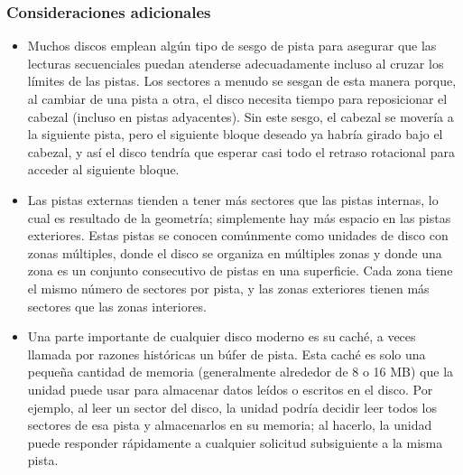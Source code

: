 \documentclass[openany]{book}
\begin{document}
\subsubsection{Consideraciones adicionales}
\begin{itemize}
    \item Muchos discos emplean algún tipo de sesgo de pista para asegurar que las lecturas secuenciales puedan atenderse adecuadamente incluso al cruzar los límites de las pistas. Los sectores a menudo se sesgan de esta manera porque, al cambiar de una pista a otra, el disco necesita tiempo para reposicionar el cabezal (incluso en pistas adyacentes). Sin este sesgo, el cabezal se movería a la siguiente pista, pero el siguiente bloque deseado ya habría girado bajo el cabezal, y así el disco tendría que esperar casi todo el retraso rotacional para acceder al siguiente bloque.
    \item Las pistas externas tienden a tener más sectores que las pistas internas, lo cual es resultado de la geometría; simplemente hay más espacio en las pistas exteriores. Estas pistas se conocen comúnmente como unidades de disco con zonas múltiples, donde el disco se organiza en múltiples zonas y donde una zona es un conjunto consecutivo de pistas en una superficie. Cada zona tiene el mismo número de sectores por pista, y las zonas exteriores tienen más sectores que las zonas interiores.
    \item Una parte importante de cualquier disco moderno es su caché, a veces llamada por razones históricas un búfer de pista. Esta caché es solo una pequeña cantidad de memoria (generalmente alrededor de 8 o 16 MB) que la unidad puede usar para almacenar datos leídos o escritos en el disco. Por ejemplo, al leer un sector del disco, la unidad podría decidir leer todos los sectores de esa pista y almacenarlos en su memoria; al hacerlo, la unidad puede responder rápidamente a cualquier solicitud subsiguiente a la misma pista.
\end{itemize}
\end{document}
